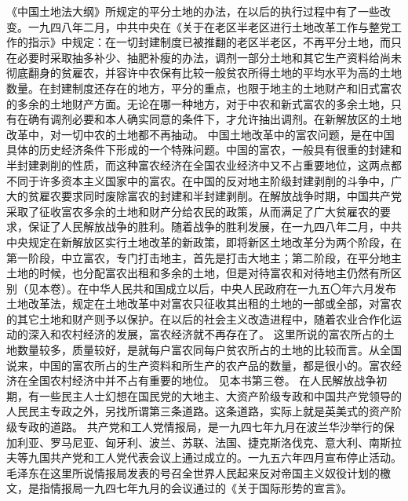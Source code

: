 \begin{maonote}
《中国土地法大纲》所规定的平分土地的办法，在以后的执行过程中有了一些改变。一九四八年二月，中共中央在《关于在老区半老区进行土地改革工作与整党工作的指示》中规定：在一切封建制度已被推翻的老区半老区，不再平分土地，而只在必要时采取抽多补少、抽肥补瘦的办法，调剂一部分土地和其它生产资料给尚未彻底翻身的贫雇农，并容许中农保有比较一般贫农所得土地的平均水平为高的土地数量。在封建制度还存在的地方，平分的重点，也限于地主的土地财产和旧式富农的多余的土地财产方面。无论在哪一种地方，对于中农和新式富农的多余土地，只有在确有调剂必要和本人确实同意的条件下，才允许抽出调剂。在新解放区的土地改革中，对一切中农的土地都不再抽动。
中国土地改革中的富农问题，是在中国具体的历史经济条件下形成的一个特殊问题。中国的富农，一般具有很重的封建和半封建剥削的性质，而这种富农经济在全国农业经济中又不占重要地位，这两点都不同于许多资本主义国家中的富农。在中国的反对地主阶级封建剥削的斗争中，广大的贫雇农要求同时废除富农的封建和半封建剥削。在解放战争时期，中国共产党采取了征收富农多余的土地和财产分给农民的政策，从而满足了广大贫雇农的要求，保证了人民解放战争的胜利。随着战争的胜利发展，在一九四八年二月，中共中央规定在新解放区实行土地改革的新政策，即将新区土地改革分为两个阶段，在第一阶段，中立富农，专门打击地主，首先是打击大地主；第二阶段，在平分地主土地的时候，也分配富农出租和多余的土地，但是对待富农和对待地主仍然有所区别（见本卷）。在中华人民共和国成立以后，中央人民政府在一九五〇年六月发布土地改革法，规定在土地改革中对富农只征收其出租的土地的一部或全部，对富农的其它土地和财产则予以保护。在以后的社会主义改造进程中，随着农业合作化运动的深入和农村经济的发展，富农经济就不再存在了。
这里所说的富农所占的土地数量较多，质量较好，是就每户富农同每户贫农所占的土地的比较而言。从全国说来，中国的富农所占的生产资料和所生产的农产品的数量，都是很小的。富农经济在全国农村经济中并不占有重要的地位。
见本书第三卷。
在人民解放战争初期，有一些民主人士幻想在国民党的大地主、大资产阶级专政和中国共产党领导的人民民主专政之外，另找所谓第三条道路。这条道路，实际上就是英美式的资产阶级专政的道路。
共产党和工人党情报局，是一九四七年九月在波兰华沙举行的保加利亚、罗马尼亚、匈牙利、波兰、苏联、法国、捷克斯洛伐克、意大利、南斯拉夫等九国共产党和工人党代表会议上通过成立的。一九五六年四月宣布停止活动。毛泽东在这里所说情报局发表的号召全世界人民起来反对帝国主义奴役计划的檄文，是指情报局一九四七年九月的会议通过的《关于国际形势的宣言》。
\end{maonote}
